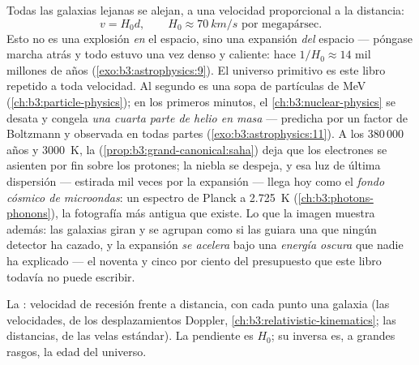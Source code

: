 \begin{definition}\label{def:b3:astrophysics:hubble}
Todas las galaxias lejanas se alejan, a una velocidad proporcional a la distancia:
\[
v = H_0d , \qquad H_0 \approx \qty{70}{km/s}
\text{ por megapársec} .
\]
Esto no es una explosión \emph{en} el espacio, sino una expansión
\emph{del} espacio --- póngase marcha atrás y todo estuvo una vez
denso y caliente: hace $1/H_0 \approx 14$ mil millones de años
(\cref{exo:b3:astrophysics:9}). El universo primitivo es este libro
repetido a toda velocidad. Al segundo es una sopa de partículas de \unit{MeV}
(\cref{ch:b3:particle-physics}); en los primeros minutos,
el \cref{ch:b3:nuclear-physics} se desata y congela
\emph{una cuarta parte de helio en masa} --- predicha por un factor de
Boltzmann y observada en todas partes
(\cref{exo:b3:astrophysics:11}). A los 380\,000 años y
\qty{3000}{K}, la 
(\cref{prop:b3:grand-canonical:saha}) deja que los electrones se asienten por fin
sobre los protones; la niebla se despeja, y esa luz de última dispersión ---
estirada mil veces por la expansión --- llega hoy como el
\emph{fondo cósmico de microondas}: un espectro de Planck a \qty{2.725}{K}
(\cref{ch:b3:photons-phonons}), la fotografía más antigua
que existe. Lo que la imagen muestra además: las galaxias giran y se agrupan
como si las guiara una \emph{} que ningún detector ha cazado, y
la expansión \emph{se acelera} bajo una \emph{energía oscura}
que nadie ha explicado --- el noventa y cinco por ciento del presupuesto
que este libro todavía no puede escribir.
\end{definition}

\begin{omfigure}

{\small La : velocidad de recesión frente a distancia, con cada punto
una galaxia (las velocidades, de los desplazamientos Doppler,
\cref{ch:b3:relativistic-kinematics}; las distancias, de las velas
estándar). La pendiente es $H_0$; su inversa es, a grandes rasgos, la edad
del universo.}
\end{omfigure}

